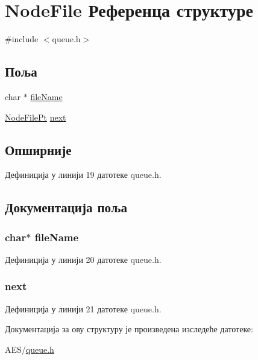 \hypertarget{struct_node_file}{\section{Node\+File Референца структуре}
\label{struct_node_file}
}


{\ttfamily \#include $<$queue.\+h$>$}

\subsection*{Поља}
\begin{DoxyCompactItemize}
\item 
char $\ast$ \hyperlink{struct_node_file_a25c8761bc1f523fe6a53db546ae83add}{file\+Name}
\item 
\hyperlink{queue_8h_a21054bd6fff2213f6e09f4e5b11300b9}{Node\+File\+Pt} \hyperlink{struct_node_file_a6e3ae14a411e5a0f5573bd9deb9b4a43}{next}
\end{DoxyCompactItemize}


\subsection{Опширније}


Дефиниција у линији 19 датотеке queue.\+h.



\subsection{Документација поља}
\hypertarget{struct_node_file_a25c8761bc1f523fe6a53db546ae83add}{
\subsubsection[{file\+Name}]{\setlength{\rightskip}{0pt plus 5cm}char$\ast$ file\+Name}}\label{struct_node_file_a25c8761bc1f523fe6a53db546ae83add}


Дефиниција у линији 20 датотеке queue.\+h.

\hypertarget{struct_node_file_a6e3ae14a411e5a0f5573bd9deb9b4a43}{
\subsubsection[{next}]{ next}}\label{struct_node_file_a6e3ae14a411e5a0f5573bd9deb9b4a43}


Дефиниција у линији 21 датотеке queue.\+h.



Документација за ову структуру је произведена изследеће датотеке\+:\begin{DoxyCompactItemize}
\item 
A\+E\+S/\hyperlink{queue_8h}{queue.\+h}\end{DoxyCompactItemize}
